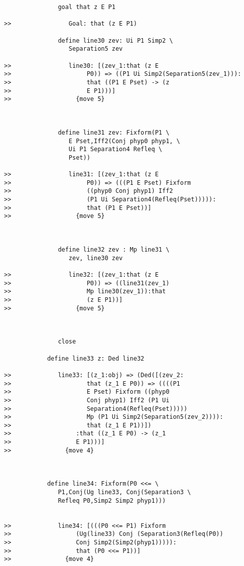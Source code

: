 \documentclass[12pt]{article}
\begin{document}
\begin{verbatim}
               goal that z E P1

>>                Goal: that (z E P1)

               define line30 zev: Ui P1 Simp2 \
                  Separation5 zev

>>                line30: [(zev_1:that (z E
>>                     P0)) => ((P1 Ui Simp2(Separation5(zev_1))):
>>                     that ((P1 E Pset) -> (z
>>                     E P1)))]
>>                  {move 5}



               define line31 zev: Fixform(P1 \
                  E Pset,Iff2(Conj phyp0 phyp1, \
                  Ui P1 Separation4 Refleq \
                  Pset))

>>                line31: [(zev_1:that (z E
>>                     P0)) => (((P1 E Pset) Fixform
>>                     ((phyp0 Conj phyp1) Iff2
>>                     (P1 Ui Separation4(Refleq(Pset))))):
>>                     that (P1 E Pset))]
>>                  {move 5}



               define line32 zev : Mp line31 \
                  zev, line30 zev

>>                line32: [(zev_1:that (z E
>>                     P0)) => ((line31(zev_1)
>>                     Mp line30(zev_1)):that
>>                     (z E P1))]
>>                  {move 5}



               close

            define line33 z: Ded line32

>>             line33: [(z_1:obj) => (Ded([(zev_2:
>>                     that (z_1 E P0)) => ((((P1
>>                     E Pset) Fixform ((phyp0
>>                     Conj phyp1) Iff2 (P1 Ui
>>                     Separation4(Refleq(Pset)))))
>>                     Mp (P1 Ui Simp2(Separation5(zev_2)))):
>>                     that (z_1 E P1))])
>>                  :that ((z_1 E P0) -> (z_1
>>                  E P1)))]
>>               {move 4}



            define line34: Fixform(P0 <<= \
               P1,Conj(Ug line33, Conj(Separation3 \
               Refleq P0,Simp2 Simp2 phyp1)))


>>             line34: [(((P0 <<= P1) Fixform
>>                  (Ug(line33) Conj (Separation3(Refleq(P0))
>>                  Conj Simp2(Simp2(phyp1))))):
>>                  that (P0 <<= P1))]
>>               {move 4}




\end{verbatim}
\end{document}
